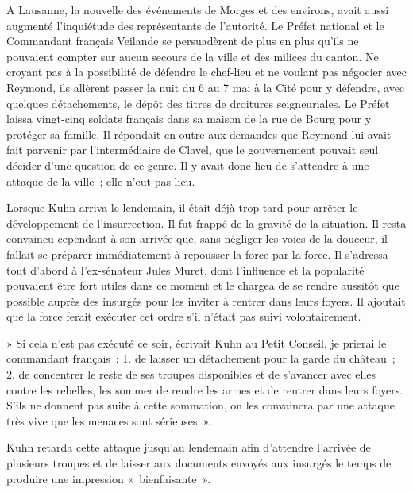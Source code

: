 \documentclass[french,twoside]{book} %
\begin{document}
\noindent A Lausanne, la nouvelle des événements de Morges et des environs, avait aussi augmenté l’inquiétude des représentants de l’autorité. Le Préfet national et le Commandant français Veilande se persuadèrent de plus en plus qu’ils ne pouvaient compter sur aucun secours de la ville et des milices du canton. Ne croyant pas à la possibilité de défendre le chef-lieu et ne voulant pas négocier avec Reymond, ils allèrent passer la nuit du 6 au 7 mai à la Cité pour y défendre, avec quelques détachements, le dépôt des titres de droitures seigneuriales. Le Préfet laissa vingt-cinq soldats français dans sa maison de la rue de Bourg pour y protéger sa famille. Il répondait en outre aux demandes que Reymond lui avait fait parvenir par l’intermédiaire de Clavel, que le gouvernement pouvait seul décider d’une question de ce genre. Il y avait donc lieu de s’attendre à une attaque de la ville ; elle n’eut pas lieu.\par
Lorsque Kuhn arriva le lendemain, il était déjà trop tard pour arrêter le développement de l’insurrection. Il fut frappé de la gravité de la situation. Il resta convaincu cependant à son arrivée que, sans négliger les voies de la douceur, il fallait se préparer immédiatement à repousser la force par la force. Il s’adressa tout d’abord à l’ex-sénateur Jules Muret, dont l’influence et la popularité pouvaient être fort utiles dans ce moment et le chargea de se rendre aussitôt que possible auprès des insurgés pour les inviter à rentrer dans leurs foyers. Il ajoutait que la force ferait exécuter cet ordre s’il n’était pas suivi volontairement.\par
» Si cela n’est pas exécuté ce soir, écrivait Kuhn au Petit Conseil, je prierai le commandant français : 1. de laisser un détachement pour la garde du château ; 2. de concentrer le reste de ses troupes disponibles et de s’avancer avec elles contre les rebelles, les sommer de rendre les armes et de rentrer dans leurs foyers. S’ils ne donnent pas suite à cette sommation, on les convaincra par une attaque très vive que les menaces sont sérieuses ».\par
Kuhn retarda cette attaque jusqu’au lendemain afin d’attendre l’arrivée de plusieurs troupes et de laisser aux documents envoyés aux insurgés le temps de produire une impression « bienfaisante ».\par
\end{document}
